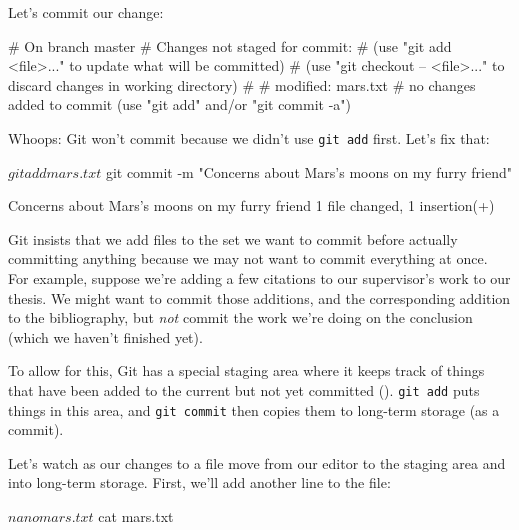 Let's commit our change:


\begin{VerbOut}
# On branch master
# Changes not staged for commit:
#   (use "git add <file>..." to update what will be committed)
#   (use "git checkout -- <file>..." to discard changes in working directory)
#
#   modified:   mars.txt
#
no changes added to commit (use "git add" and/or "git commit -a")
\end{VerbOut}

Whoops: Git won't commit because we didn't use \texttt{git add} first.
Let's fix that:

\begin{VerbIn}
$ git add mars.txt
$ git commit -m "Concerns about Mars's moons on my furry friend"
\end{VerbIn}

\begin{VerbOut}
[master 34961b1] Concerns about Mars's moons on my furry friend
 1 file changed, 1 insertion(+)
\end{VerbOut}

Git insists that we add files to the set we want to commit before
actually committing anything because we may not want to commit
everything at once. For example, suppose we're adding a few citations to
our supervisor's work to our thesis. We might want to commit those
additions, and the corresponding addition to the bibliography, but
\emph{not} commit the work we're doing on the conclusion (which we
haven't finished yet).

To allow for this, Git has a special staging area where it keeps track
of things that have been added to the current
 but not yet committed ().
\texttt{git add} puts things in this area, and \texttt{git commit} then
copies them to long-term storage (as a commit).


Let's watch as our changes to a file move from our editor to the staging
area and into long-term storage. First, we'll add another line to the
file:

\begin{VerbIn}
$ nano mars.txt
$ cat mars.txt
\end{VerbIn}

